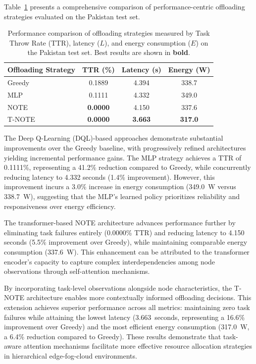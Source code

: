 \documentclass[preprint,3p,authoryear]{elsarticle}
\begin{document}
Table~\ref{tab:results_comparison} presents a comprehensive comparison of performance-centric offloading strategies evaluated on the Pakistan test set. 

\begin{table}[htbp]
\centering
\begin{tabular}{lccc}
\toprule
\textbf{Offloading Strategy} & \textbf{TTR (\%)} & \textbf{Latency (s)} & \textbf{Energy (W)} \\
\midrule
Greedy 
 & 0.1889
 & 4.394
 & 338.7 \\
\midrule
MLP 
 & 0.1111
 & 4.332
 & 349.0 \\
NOTE 
 & \textbf{0.0000} 
 & 4.150
 & 337.6 \\
T-NOTE 
 & \textbf{0.0000} 
 & \textbf{3.663} 
 & \textbf{317.0} \\
\bottomrule
\end{tabular}
\caption{Performance comparison of offloading strategies measured by Task Throw Rate (TTR), latency ($L$), and energy consumption ($E$) on the Pakistan test set. Best results are shown in \textbf{bold}.}
\label{tab:results_comparison}
\end{table}

The Deep Q-Learning (DQL)-based approaches demonstrate substantial improvements over the Greedy baseline, with progressively refined architectures yielding incremental performance gains. The MLP strategy achieves a TTR of 0.1111\%, representing a 41.2\% reduction compared to Greedy, while concurrently reducing latency to 4.332 seconds (1.4\% improvement). However, this improvement incurs a 3.0\% increase in energy consumption (349.0~W versus 338.7~W), suggesting that the MLP's learned policy prioritizes reliability and responsiveness over energy efficiency.

The transformer-based NOTE architecture advances performance further by eliminating task failures entirely (0.0000\% TTR) and reducing latency to 4.150 seconds (5.5\% improvement over Greedy), while maintaining comparable energy consumption (337.6~W). This enhancement can be attributed to the transformer encoder's capacity to capture complex interdependencies among node observations through self-attention mechanisms.

By incorporating task-level observations alongside node characteristics, the T-NOTE architecture enables more contextually informed offloading decisions. This extension achieves superior performance across all metrics: maintaining zero task failures while attaining the lowest latency (3.663~seconds, representing a 16.6\% improvement over Greedy) and the most efficient energy consumption (317.0~W, a 6.4\% reduction compared to Greedy). These results demonstrate that task-aware attention mechanisms facilitate more effective resource allocation strategies in hierarchical edge-fog-cloud environments.
\end{document}
